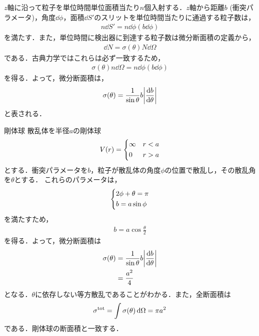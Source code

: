 \documentclass{report}
\begin{document}
  $z$軸に沿って粒子を単位時間単位面積当たり$n$個入射する．$z$軸から距離$b$ (衝突パラメータ)，角度$\dd{\phi}$，面積$\dd{S'}$のスリットを単位時間当たりに通過する粒子数は，
  \begin{align}
    n\dd{S'} = n \dd{\phi} (b \dd{\phi})
  \end{align}
  を満たす．また，単位時間に検出器に到達する粒子数は微分断面積の定義から，
  \begin{align}
    \dd{N} = \sigma (\theta) N \dd{\Omega}
  \end{align}
  である．古典力学ではこれらは必ず一致するため，
  \begin{align}
    \sigma (\theta) n \dd{\Omega} = n \dd{\phi} (b \dd{\phi})
  \end{align}
  を得る．よって，微分断面積は，
  \begin{align}
    \sigma(\theta) = \frac{1}{\sin \theta} b \abs{\frac{\dd{b}}{\dd{\theta}}}
  \end{align}
  と表される．
  \begin{myex}{剛体球}{}
    散乱体を半径$a$の剛体球
    \begin{align}
      V(r) = 
      \begin{dcases}
        \infty & r < a \\
        0 & r > a
      \end{dcases}
    \end{align}
    とする．衝突パラメータを$b$，粒子が散乱体の角度$\phi$の位置で散乱し，その散乱角を$\theta$とする．
    これらのパラメータは，
    \begin{align}
      \begin{dcases}
        2\phi + \theta = \pi\\
        b = a\sin \phi
      \end{dcases}
    \end{align}
    を満たすため，
    \begin{align}
      b = a\cos \frac{\theta}{2}
    \end{align}
    を得る．よって，微分断面積は
    \begin{align}
    \sigma(\theta) &= \frac{1}{\sin \theta} b \abs{\frac{\dd{b}}{\dd{\theta}}}\\
    &= \frac{a^2}{4}
    \end{align}
    となる．$\theta$に依存しない等方散乱であることがわかる．また，全断面積は
    \begin{align}
      \sigma^{\mathrm{tot}} = \int \sigma(\theta) \dd{\Omega} = \pi a^2
    \end{align}
    である．剛体球の断面積と一致する．
  \end{myex}
\end{document}

